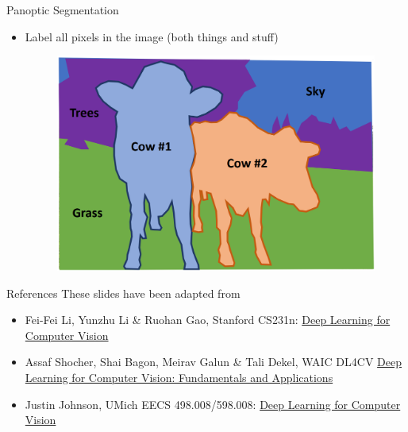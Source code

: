 \documentclass[10pt]{beamer}
\theoremstyle{remark}
\theoremstyle{definition}
\begin{document}
\begin{frame}{Panoptic Segmentation}
\begin{itemize}
    \item Label all pixels in the image (both things and stuff)
    \begin{figure}
    \centering
    \includegraphics[width=1.0\textwidth,height=0.7\textheight,keepaspectratio]{./images/ins_10.png}
    \end{figure}
\end{itemize}
\end{frame}


\begin{frame}{References}
These slides have been adapted from
\begin{itemize}
    \item Fei-Fei Li, Yunzhu Li \& Ruohan Gao, Stanford CS231n: \href{http://cs231n.stanford.edu/index.html}{Deep Learning for Computer Vision}
    \item Assaf Shocher, Shai Bagon, Meirav Galun \& Tali Dekel, WAIC DL4CV \href{https://dl4cv.github.io/index.html}{Deep Learning for Computer Vision: Fundamentals and Applications}
    \item Justin Johnson, UMich EECS 498.008/598.008: \href{https://web.eecs.umich.edu/~justincj/teaching/eecs498/WI2022/}{Deep Learning for Computer Vision}
\end{itemize}

\end{frame}

    
\end{document}

